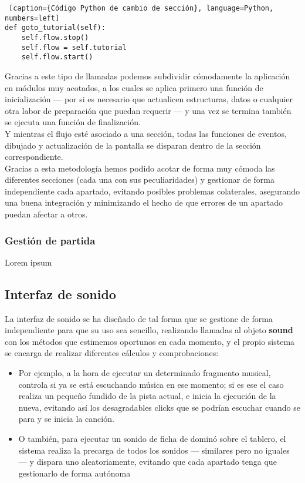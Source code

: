 \begin{lstlisting} [caption={Código Python de cambio de sección}, language=Python, numbers=left]
def goto_tutorial(self):
    self.flow.stop()
    self.flow = self.tutorial
    self.flow.start()
\end{lstlisting}

Gracias a este tipo de llamadas podemos subdividir cómodamente la aplicación en módulos muy acotados, a los cuales se aplica
primero una función de inicialización --- por si es necesario que actualicen estructuras, datos o cualquier otra labor
de preparación que puedan requerir --- y una vez se termina también se ejecuta una función de finalización. \\

Y mientras el flujo esté asociado a una sección, todas las funciones de eventos, dibujado y actualización de la pantalla
se disparan dentro de la sección correspondiente. \\

Gracias a esta metodología hemos podido acotar de forma muy cómoda las diferentes secciones (cada una con sus peculiaridades)
y gestionar de forma independiente cada apartado, evitando posibles problemas colaterales, asegurando una buena
integración y minimizando el hecho de que errores de un apartado puedan afectar a otros. \\


\subsubsection{Gestión de partida}


Lorem ipsum


\subsection{Interfaz de sonido}

La interfaz de sonido se ha diseñado de tal forma que se gestione de forma independiente para que su uso sea sencillo,
realizando llamadas al objeto \textbf{sound} con los métodos que estimemos oportunos en cada momento, y el propio
sistema se encarga de realizar diferentes cálculos y comprobaciones:

\begin{itemize} 
    \item Por ejemplo, a la hora de ejecutar un determinado fragmento musical, controla si ya se está escuchando música
        en ese momento; si es ese el caso realiza un pequeño fundido de la pista actual, e inicia la ejecución de la
        nueva, evitando así los desagradables clicks que se podrían escuchar cuando se para y se inicia la canción.
    \item O también, para ejecutar un sonido de ficha de dominó sobre el tablero, el sistema realiza la precarga de todos
        los sonidos --- similares pero no iguales --- y dispara uno aleatoriamente, evitando que cada apartado tenga
        que gestionarlo de forma autónoma
\end{itemize}


